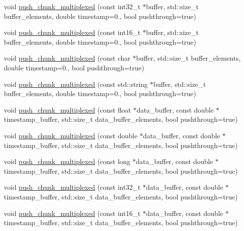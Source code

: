 \begin{DoxyCompactItemize}
\item 
void \hyperlink{classlsl_1_1stream__outlet_a161ead63f9a373d69744c3c54a650c1d}{push\+\_\+chunk\+\_\+multiplexed} (const int32\+\_\+t $\ast$buffer, std\+::size\+\_\+t buffer\+\_\+elements, double timestamp=0., bool pushthrough=true)
\item 
void \hyperlink{classlsl_1_1stream__outlet_a78a48678f40e2bbb591aa0b9da9891d8}{push\+\_\+chunk\+\_\+multiplexed} (const int16\+\_\+t $\ast$buffer, std\+::size\+\_\+t buffer\+\_\+elements, double timestamp=0., bool pushthrough=true)
\item 
void \hyperlink{classlsl_1_1stream__outlet_ab462e099798c3055b8f976767b239379}{push\+\_\+chunk\+\_\+multiplexed} (const char $\ast$buffer, std\+::size\+\_\+t buffer\+\_\+elements, double timestamp=0., bool pushthrough=true)
\item 
void \hyperlink{classlsl_1_1stream__outlet_a2b4da4c1a2c3c47f39ed8a3f2cc717a5}{push\+\_\+chunk\+\_\+multiplexed} (const std\+::string $\ast$buffer, std\+::size\+\_\+t buffer\+\_\+elements, double timestamp=0., bool pushthrough=true)
\item 
void \hyperlink{classlsl_1_1stream__outlet_a4cc12f447c2ccfe67a118a3c23215f0d}{push\+\_\+chunk\+\_\+multiplexed} (const float $\ast$data\+\_\+buffer, const double $\ast$timestamp\+\_\+buffer, std\+::size\+\_\+t data\+\_\+buffer\+\_\+elements, bool pushthrough=true)
\item 
void \hyperlink{classlsl_1_1stream__outlet_a4f476f737355d7c2b128dcc1798f46b7}{push\+\_\+chunk\+\_\+multiplexed} (const double $\ast$data\+\_\+buffer, const double $\ast$timestamp\+\_\+buffer, std\+::size\+\_\+t data\+\_\+buffer\+\_\+elements, bool pushthrough=true)
\item 
void \hyperlink{classlsl_1_1stream__outlet_a3ec413951e8613ce5289a265aaabf6e9}{push\+\_\+chunk\+\_\+multiplexed} (const long $\ast$data\+\_\+buffer, const double $\ast$timestamp\+\_\+buffer, std\+::size\+\_\+t data\+\_\+buffer\+\_\+elements, bool pushthrough=true)
\item 
void \hyperlink{classlsl_1_1stream__outlet_a10acfcf6b1db179f04596def60bc3792}{push\+\_\+chunk\+\_\+multiplexed} (const int32\+\_\+t $\ast$data\+\_\+buffer, const double $\ast$timestamp\+\_\+buffer, std\+::size\+\_\+t data\+\_\+buffer\+\_\+elements, bool pushthrough=true)
\item 
void \hyperlink{classlsl_1_1stream__outlet_ac90405c89feb8c95a493f42a0c749421}{push\+\_\+chunk\+\_\+multiplexed} (const int16\+\_\+t $\ast$data\+\_\+buffer, const double $\ast$timestamp\+\_\+buffer, std\+::size\+\_\+t data\+\_\+buffer\+\_\+elements, bool pushthrough=true)

\end{DoxyCompactItemize}
